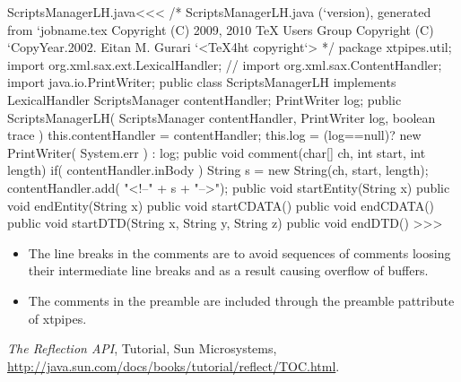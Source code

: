 \documentclass{article}
\begin{document}
\<ScriptsManagerLH.java\><<<
/* ScriptsManagerLH.java (`version), generated from `jobname.tex
   Copyright (C) 2009, 2010 TeX Users Group
   Copyright (C) `CopyYear.2002. Eitan M. Gurari
`<TeX4ht copyright`> */
package xtpipes.util;
import org.xml.sax.ext.LexicalHandler;
// import org.xml.sax.ContentHandler;
import java.io.PrintWriter;
public class ScriptsManagerLH implements LexicalHandler {
       ScriptsManager contentHandler;
       PrintWriter log;
   public ScriptsManagerLH( ScriptsManager contentHandler,
                          PrintWriter log, boolean trace ){
     this.contentHandler = contentHandler;
     this.log = (log==null)? new PrintWriter( System.err ) : log;
   }
   public void comment(char[] ch, int start, int length){
     if( contentHandler.inBody ){
        String s = new String(ch, start, length);
        contentHandler.add(  "<!--" + s + "\n-->");
   } }
   public void startEntity(String x){}
   public void endEntity(String x){}
   public void startCDATA(){}
   public void endCDATA(){}
   public void startDTD(String x, String y, String z){}
   public void endDTD(){}
}
>>>

\begin{itemize}
\item
The line breaks in the comments are to avoid sequences of comments
loosing their intermediate line breaks and as a result causing
overflow of buffers.

\item The comments in the preamble are included through the
preamble pattribute of xtpipes.
\end{itemize}











\begin{thebibliography}{10}
{\sl The Reflection API},
Tutorial, Sun Microsystems,
\url{http://java.sun.com/docs/books/tutorial/reflect/TOC.html}.
\end{thebibliography}





{
}
{ 
}
\end{document}
